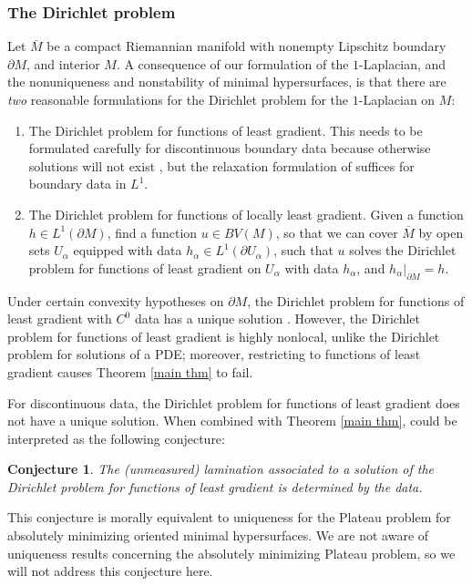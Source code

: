 \documentclass[reqno,11pt]{amsart}
\newtheorem{conjecture}[theorem]{Conjecture}
\theoremstyle{definition}
\numberwithin{equation}{section}
\begin{document}
\subsubsection{The Dirichlet problem}
Let $\overline M$ be a compact Riemannian manifold with nonempty Lipschitz boundary $\partial M$, and interior $M$.
A consequence of our formulation of the $1$-Laplacian, and the nonuniqueness and nonstability of minimal hypersurfaces, is that there are \emph{two} reasonable formulations for the Dirichlet problem for the $1$-Laplacian on $M$:
\begin{enumerate}
\item The Dirichlet problem for functions of least gradient. This needs to be formulated carefully for discontinuous boundary data because otherwise solutions will not exist \cite{spradlin2013traces}, but the relaxation formulation of \cite{Mazon14} suffices for boundary data in $L^1$.
\item The Dirichlet problem for functions of locally least gradient. Given a function $h \in L^1(\partial M)$, find a function $u \in BV(M)$, so that we can cover $\overline M$ by open sets $U_\alpha$ equipped with data $h_\alpha \in L^1(\partial U_\alpha)$, such that $u$ solves the Dirichlet problem for functions of least gradient on $U_\alpha$ with data $h_\alpha$, and $h_\alpha|_{\partial M} = h$.
\end{enumerate}
Under certain convexity hypotheses on $\partial M$, the Dirichlet problem for functions of least gradient with $C^0$ data has a unique solution \cite{ZiemerWilliamsSternberg1992}.
However, the Dirichlet problem for functions of least gradient is highly nonlocal, unlike the Dirichlet problem for solutions of a PDE; moreover, restricting to functions of least gradient causes Theorem \ref{main thm} to fail.

For discontinuous data, the Dirichlet problem for functions of least gradient does not have a unique solution.
When combined with Theorem \ref{main thm}, \cite[Remark 2.8]{Mazon14} could be interpreted as the following conjecture:

\begin{conjecture}
The (unmeasured) lamination associated to a solution of the Dirichlet problem for functions of least gradient is determined by the data.
\end{conjecture}

This conjecture is morally equivalent to uniqueness for the Plateau problem for absolutely minimizing oriented minimal hypersurfaces.
We are not aware of uniqueness results concerning the absolutely minimizing Plateau problem, so we will not address this conjecture here.
\end{document}
